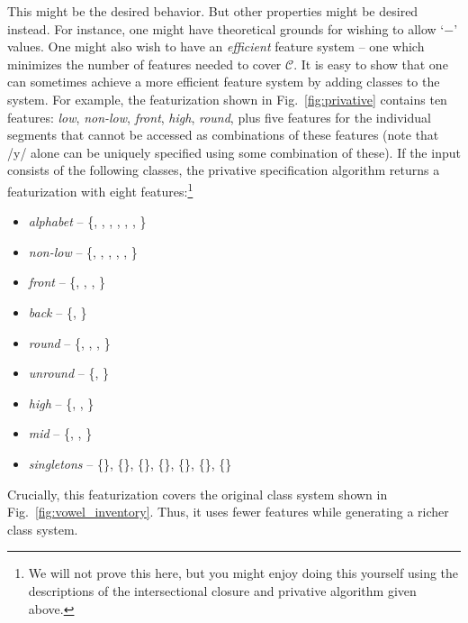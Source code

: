 \documentclass[11pt, oneside]{article}   	%
\begin{document}
This might be the desired behavior. But other properties might be desired instead. For instance, one might have theoretical grounds for wishing to allow `$-$' values. One might also wish to have an \textit{efficient} feature system -- one which minimizes the number of features needed to cover $\mathcal C$. It is easy to show that one can sometimes achieve a more efficient feature system by adding classes to the system. For example, the featurization shown in Fig.~\ref{fig:privative} contains ten features: \textit{low}, \textit{non-low}, \textit{front}, \textit{high}, \textit{round}, plus five features for the individual segments that cannot be accessed as combinations of these features (note that /y/ alone can be uniquely specified using some combination of these). If the input consists of the following classes, the privative specification algorithm returns a featurization with eight features:\footnote{We will not prove this here, but you might enjoy doing this yourself using the descriptions of the intersectional closure and privative algorithm given above.}

 \begin{itemize}
	\item \textit{alphabet} -- \{, , , , \textipa{\oe}, , \} 
	\item \textit{non-low} -- \{, , , , \textipa{\oe}, \} 
    \item \textit{front} -- \{, , , \textipa{\oe}\}
    \item \textit{back} -- \{, \}
    \item \textit{round} -- \{, , \textipa{\oe}, \}
    \item \textit{unround} -- \{, \}
    \item \textit{high} --  \{, , \}
    \item \textit{mid} --  \{, \textipa{\oe}, \}
    \item \textit{singletons} -- \{\}, \{\}, \{\}, \{\}, \{\textipa{\oe}\}, \{\}, \{\}
    \end{itemize}
Crucially, this featurization covers the original class system shown in Fig.~\ref{fig:vowel_inventory}. Thus, it uses fewer features while generating a richer class system.
\end{document}
